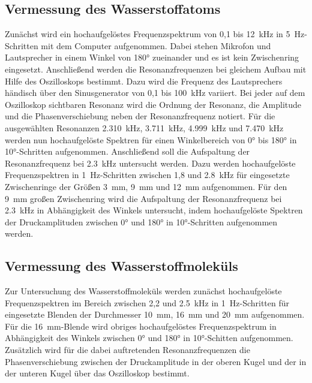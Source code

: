     \subsection{Vermessung des Wasserstoffatoms}
        Zunächst wird ein hochaufgelöstes Frequenzspektrum von 0,1 bis \SI{12}{\kilo\hertz} in \SI{5}{\hertz}-Schritten mit dem Computer aufgenommen. Dabei stehen Mikrofon und Lautsprecher in einem Winkel von 
        180° zueinander und es ist kein Zwischenring eingesetzt.\newline
        Anschließend werden die Resonanzfrequenzen bei gleichem Aufbau mit Hilfe des Oszilloskops bestimmt. Dazu wird die Frequenz des Lautsprechers händisch über den Sinusgenerator von 0,1 bis 
        \SI{100}{\kilo\hertz} variiert. Bei jeder auf dem Oszilloskop sichtbaren Resonanz wird die Ordnung der Resonanz, die Amplitude und die Phasenverschiebung neben der Resonanzfrequenz notiert.\newline
        Für die ausgewählten Resonanzen \SI{2.310}{\kilo\hertz}, \SI{3.711}{\kilo\hertz}, \SI{4.999}{\kilo\hertz} und \SI{7.470}{\kilo\hertz} werden nun hochaufgelöste Spektren für einen Winkelbereich von 
        0° bis 180° in 10°-Schritten aufgenommen.\newline
        Anschließend soll die Aufspaltung der Resonanzfrequenz bei \SI{2.3}{\kilo\hertz} untersucht werden. Dazu werden hochaufgelöste Frequenzspektren in \SI{1}{\hertz}-Schritten zwischen 1,8 und 
        \SI{2.8}{\kilo\hertz} für eingesetzte Zwischenringe der Größen \SI{3}{\milli\metre}, \SI{9}{\milli\metre} und \SI{12}{\milli\metre} aufgenommen.\newline
        Für den \SI{9}{\milli\metre} großen Zwischenring wird die Aufspaltung der Resonanzfrequenz bei \SI{2.3}{\kilo\hertz} in Abhängigkeit des Winkels untersucht, indem hochaufgelöste Spektren der 
        Druckamplituden zwischen 0° und 180° in 10°-Schritten aufgenommen werden.

    \subsection{Vermessung des Wasserstoffmoleküls}
        Zur Untersuchung des Wasserstoffmoleküls werden zunächst hochaufgelöste Frequenzspektren im Bereich zwischen 2,2 und \SI{2.5}{\kilo\hertz} in \SI{1}{\hertz}-Schritten für eingesetzte Blenden der 
        Durchmesser \SI{10}{\milli\metre}, \SI{16}{\milli\metre} und \SI{20}{\milli\metre} aufgenommen.\newline
        Für die \SI{16}{\milli\metre}-Blende wird obriges hochaufgelöstes Frequenzspektrum in Abhängigkeit des Winkels zwischen 0° und 180° in 10°-Schitten aufgenommen. Zusätzlich wird für die dabei 
        auftretenden Resonanzfrequenzen die Phasenverschiebung zwischen der Druckamplitude in der oberen Kugel und der in der unteren Kugel über das Oszilloskop bestimmt.
        
